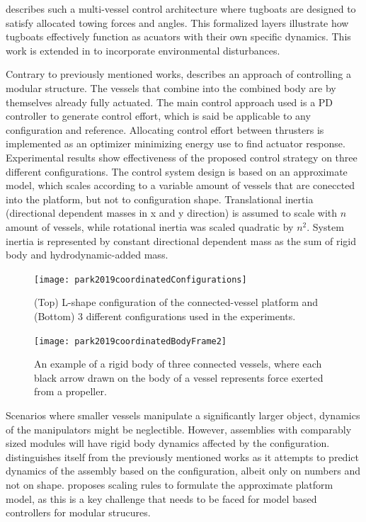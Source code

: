 \citet{du2020cooperative} describes such a multi-vessel control architecture where tugboats are designed to satisfy allocated towing forces and angles. This formalized layers illustrate how tugboats effectively function as acuators with their own specific dynamics. This work is extended in \citet{du2021cooperative} to incorporate environmental disturbances. 

Contrary to previously mentioned works, \citet{park2019coordinated}  describes an approach of controlling a modular structure. The vessels that combine into the combined body are by themselves already fully actuated. The main control approach used is a PD controller to generate control effort, which is said be applicable to any configuration and reference. Allocating control effort between thrusters is implemented as an optimizer minimizing energy use to find actuator response. Experimental results show effectiveness of the proposed control strategy on three different configurations. 
The control system design is based on an approximate model, which scales according to a variable amount of vessels that are coneccted into the platform, but not to configuration shape. Translational inertia (directional dependent masses in x and y direction) is assumed to scale with $n$ amount of vessels, while rotational inertia was scaled quadratic by $n^2$. System inertia is represented by constant directional dependent mass as the sum of rigid body and hydrodynamic-added mass. 

\begin{figure}[h!]
	\centering
	\texttt{[image: park2019coordinatedConfigurations]}
	\caption{ (Top) L-shape configuration of the connected-vessel platform and
		(Bottom) 3 different configurations used in the experiments. \citet{park2019coordinated}}
	\label{fig:park2019coordinatedConfigurations}
\end{figure}


\begin{figure}[h!]
	\centering
	\texttt{[image: park2019coordinatedBodyFrame2]}
	\caption{An example of a rigid body of three connected vessels, where each black arrow drawn on the body of a vessel represents force exerted from a propeller. \citet{park2019coordinated}}
	\label{fig:park2019coordinatedBodyFrame}
\end{figure}

Scenarios where smaller vessels manipulate a significantly larger object, dynamics of the manipulators might be neglectible. However, assemblies with comparably sized modules will have rigid body dynamics affected by the configuration. \citet{park2019coordinated} distinguishes itself from the previously mentioned works as it attempts to predict dynamics of the assembly based on the configuration, albeit only on numbers and not on shape. \citet{park2019coordinated} proposes scaling rules to formulate the approximate platform model, as this is a key challenge that needs to be faced for model based controllers for modular strucures. 

